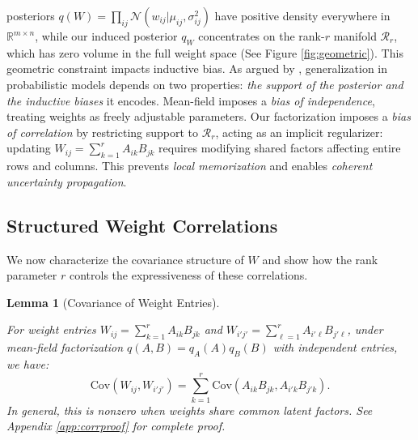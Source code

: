 \documentclass{article}
\theoremstyle{plain}
\newtheorem{lemma}[theorem]{Lemma}
\theoremstyle{definition}
\theoremstyle{remark}
\begin{document}
posteriors $q(W) = \prod_{ij} \mathcal{N}(w_{ij}|\mu_{ij}, \sigma_{ij}^2)$ 
have positive density everywhere in $\mathbb{R}^{m \times n}$, while our induced 
posterior $q_W$ concentrates on the rank-$r$ manifold $\mathcal{R}_r$, which 
has zero volume in the full weight space (See Figure \ref{fig:geometric}). This geometric constraint impacts inductive bias. As argued by 
\citet{wilson2020bayesian}, generalization in probabilistic models depends 
on two properties: \textit{the support of the posterior and the 
inductive biases} it encodes. Mean-field imposes a \emph{bias of independence}, 
treating weights as freely adjustable parameters. Our factorization imposes a 
\emph{bias of correlation} by restricting support to $\mathcal{R}_r$, acting 
as an implicit regularizer: updating $W_{ij} = \sum_{k=1}^r A_{ik}B_{jk}$ 
requires modifying shared factors affecting entire rows and columns. This prevents \emph{local memorization} and enables \emph{coherent uncertainty 
propagation}.

\subsection{Structured Weight Correlations}
\label{sec:theory:correlations}

 
We now characterize the covariance structure of $W$ and 
show how the rank parameter $r$ controls the expressiveness of these correlations.
\begin{lemma}[Covariance of Weight Entries]
\label{lem:covariance}

For weight entries $W_{ij} = \sum_{k=1}^r A_{ik} B_{jk}$ and 
$W_{i'j'} = \sum_{\ell=1}^r A_{i'\ell} B_{j'\ell}$, under mean-field 
factorization $q(A,B) = q_A(A) q_B(B)$ with independent entries, we have:
{\small
\begin{equation}
\mathrm{Cov}(W_{ij}, W_{i'j'}) = \sum_{k=1}^r \mathrm{Cov}(A_{ik}B_{jk}, A_{i'k}B_{j'k}).
\end{equation}
}In general, this is nonzero when weights share common latent factors. See Appendix \ref{app:corrproof} for complete proof.
\end{lemma}

\end{document}
